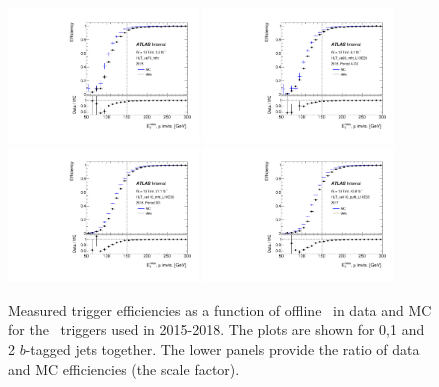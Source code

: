 \begin{figure}[tb!]
    \centering
    \includegraphics[width=0.45\textwidth]{chapters/c6/figures/METTriggerCalibration/efficiecy_HLT_xe70_mht.pdf}
    \includegraphics[width=0.45\textwidth]{chapters/c6/figures/METTriggerCalibration/efficiecy_HLT_xe90_mht_L1XE50.pdf}
    \includegraphics[width=0.45\textwidth]{chapters/c6/figures/METTriggerCalibration/efficiecy_HLT_xe110_mht_L1XE50.pdf}
    \includegraphics[width=0.45\textwidth]{chapters/c6/figures/METTriggerCalibration/efficiecy_HLT_xe110_pufit_L1XE55.pdf}
    \caption{Measured trigger efficiencies as a function of offline \METnomu~in data and MC for the \MET~triggers used in 2015-2018. The plots are shown for 0,1 and 2 $b$-tagged jets together. The lower panels provide the ratio of data and MC efficiencies (the scale factor).}
    \label{fig:TrigEff}
\end{figure}

